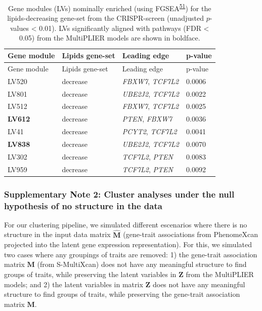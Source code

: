 \documentclass[
  a4paper,
]{article}
\newenvironment{tablenos:tagged-table}[1][]{
  \let\oldtablename\tablename
  \renewcommand{\tablename}{Supplementary Table}
}{
  \let\tablename\oldtablename
}
\begin{document}
\begin{tablenos:tagged-table}[S2]

\begin{longtable}[]{@{}llll@{}}
\caption{Gene modules (LVs) nominally enriched (using FGSEA\textsuperscript{\protect\hyperlink{ref-Z8WXLD67}{51}}) for the lipids-decreasing gene-set from the CRISPR-screen (unadjusted \(p\)-values \textless{} 0.01).
LVs significantly aligned with pathways (FDR \textless{} 0.05) from the MultiPLIER models are shown in boldface.
\label{tbl:sup:lipids_crispr:modules_enriched_decrease}}\label{tbl:sup:lipids_crispr:modules_enriched_decrease}\tabularnewline
\toprule()
Gene module & Lipids gene-set & Leading edge & p-value \\
\midrule()
\endfirsthead
\toprule()
Gene module & Lipids gene-set & Leading edge & p-value \\
\midrule()
\endhead
LV520 & decrease & \emph{FBXW7}, \emph{TCF7L2} & 0.0006 \\
LV801 & decrease & \emph{UBE2J2}, \emph{TCF7L2} & 0.0022 \\
LV512 & decrease & \emph{FBXW7}, \emph{TCF7L2} & 0.0025 \\
\textbf{LV612} & decrease & \emph{PTEN}, \emph{FBXW7} & 0.0036 \\
LV41 & decrease & \emph{PCYT2}, \emph{TCF7L2} & 0.0041 \\
\textbf{LV838} & decrease & \emph{UBE2J2}, \emph{TCF7L2} & 0.0070 \\
LV302 & decrease & \emph{TCF7L2}, \emph{PTEN} & 0.0083 \\
LV959 & decrease & \emph{TCF7L2}, \emph{PTEN} & 0.0092 \\
\bottomrule()
\end{longtable}

\end{tablenos:tagged-table}

\clearpage

\hypertarget{sm:clustering:null_sim}{%
\subsubsection{Supplementary Note 2: Cluster analyses under the null hypothesis of no structure in the data}\label{sm:clustering:null_sim}}

For our clustering pipeline, we simulated different escenarios where there is no structure in the input data matrix \(\hat{\mathbf{M}}\) (gene-trait associations from PhenomeXcan projected into the latent gene expression representation).
For this, we simulated two cases where any groupings of traits are removed:
1) the gene-trait association matrix \(\mathbf{M}\) (from S-MultiXcan) does not have any meaningful structure to find groups of traits, while preserving the latent variables in \(\mathbf{Z}\) from the MultiPLIER models;
and 2) the latent variables in matrix \(\mathbf{Z}\) does not have any meaningful structure to find groups of traits, while preserving the gene-trait association matrix \(\mathbf{M}\).
\end{document}
